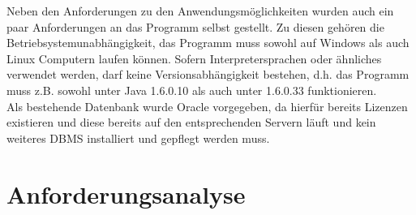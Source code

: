 Neben den Anforderungen zu den Anwendungsmöglichkeiten wurden auch ein paar Anforderungen an das Programm selbst gestellt.
Zu diesen gehören die Betriebsystemunabhängigkeit, das Programm muss sowohl auf Windows als auch Linux Computern laufen können. Sofern Interpretersprachen oder ähnliches verwendet werden, darf keine Versionsabhängigkeit bestehen, d.h. das Programm muss z.B. sowohl unter Java 1.6.0.10 als auch unter 1.6.0.33 funktionieren.\\
Als bestehende Datenbank wurde Oracle vorgegeben, da hierfür bereits Lizenzen existieren und diese bereits auf den entsprechenden Servern läuft und kein weiteres DBMS installiert und gepflegt werden muss.\\

\section{Anforderungsanalyse}
\label{sec:anfanalyse}

